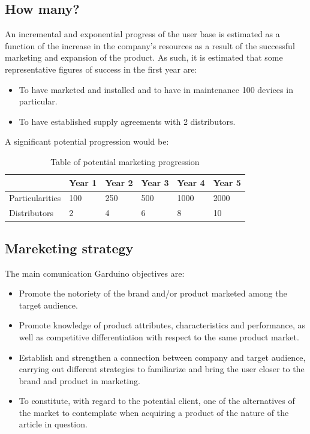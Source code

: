 \documentclass[11pt,a4paper]{article}
\begin{document}
\subsection{How many?}
An incremental and exponential progress of the user base is estimated as a function of the increase in the company's resources as a result of the successful marketing and expansion of the product. As such, it is estimated that some representative figures of success in the first year are: 

\begin{itemize}
\item To have marketed and installed and to have in maintenance 100 devices in particular. 
\item To have established supply agreements with 2 distributors. 
\end{itemize}
A significant potential progression would be:
\begin{table}[htbp]
\centering
\begin{tabular}{|l|l|l|l|l|l|}
\hline
\textbf{} & \textbf{Year 1} & \textbf{Year 2} & \textbf{Year 3} & \textbf{Year 4} & \textbf{Year 5} \\
\hline \hline
Particularities & 100 & 250 & 500 & 1000 & 2000 \\
\hline
Distributors & 2 & 4 & 6 & 8 & 10 \\
\hline
\end{tabular}
\caption{Table of potential marketing progression}
\end{table}

\subsection{Mareketing strategy}
The main comunication Garduino objectives are:
\begin{itemize}
\item Promote the notoriety of the brand and/or product marketed among the target audience.
\item Promote knowledge of product attributes, characteristics and performance, as well as competitive differentiation with respect to the same product market.
\item Establish and strengthen a connection between company and target audience, carrying out different strategies to familiarize and bring the user closer to the brand and product in marketing.
\item To constitute, with regard to the potential client, one of the alternatives of the market to contemplate when acquiring a product of the nature of the article in question.
\end{itemize}
\end{document}
